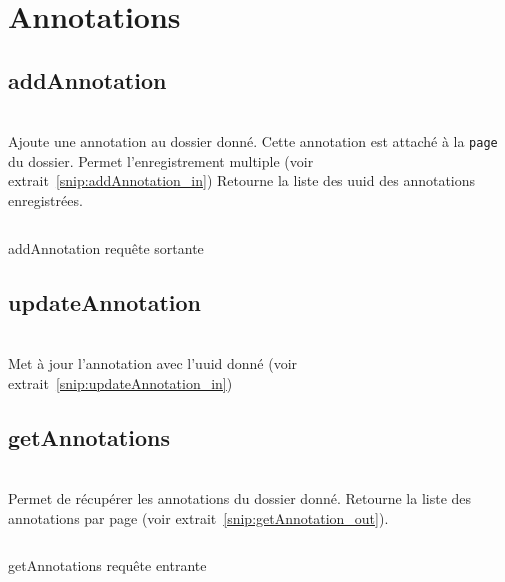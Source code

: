 \section{Annotations}

\subsection{addAnnotation}
\\

Ajoute une annotation au dossier donné. Cette annotation est attaché à la \verb|page| du dossier. Permet l'enregistrement multiple (voir extrait~\ref{snip:addAnnotation_in})
Retourne la liste des uuid des annotations enregistrées.

\begin{codesnippet}
\inputminted[frame=single,linenos,fontsize=\footnotesize]{javascript}{extraits/addAnnotation_out.js}
\caption{addAnnotation requête sortante}
\label{snip:addAnnotation_out}
\end{codesnippet}

\subsection{updateAnnotation}
\\

Met à jour l'annotation avec l'uuid donné (voir extrait~\ref{snip:updateAnnotation_in})

\subsection{getAnnotations}
\\

Permet de récupérer les annotations du dossier donné. Retourne la liste des annotations par page (voir extrait~\ref{snip:getAnnotation_out}).

\begin{codesnippet}
\inputminted[frame=single,linenos,fontsize=\footnotesize]{javascript}{extraits/getAnnotations_in.js}
\caption{getAnnotations requête entrante}
\label{snip:getAnnotations_in}
\end{codesnippet}
